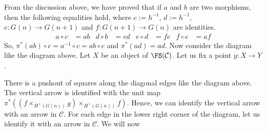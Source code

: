 \documentclass[a4paper,reqno,oneside]{article}
\begin{document}
From the discussion above, we have proved that if $a$ and $b$ are two morphisms, then the following equalities hold, where $c := h^{-1}$, $d := h^{-1}$, $e: G(n) \rightarrow G(n + 1)$ and $f: G(n + 1) \rightarrow G(n)$ are identities.
\[
\begin{array}{ccccl}
a \circ c &= ab & d \circ b &= cd & e \circ d &= fe & f \circ e &= af
\end{array}
\]
So, $\pi^{*}(ab) \circ c = a^{-1} \circ c = ab \circ c$ and $\pi^{*}(ad) = ad$. Now consider the diagram like the diagram above. Let $X$ be an object of $\FS(\mathcal{C})$. Let us fix a point $y: X \rightarrow Y$.

There is a pushout of squares along the diagonal edges like the diagram above. The vertical arrow is identified with the unit map $\pi^{*}((f \times_{H^{\times}(G(n))} g) \times_{H^{\times}(G(n))} f)$. Hence, we can identify the vertical arrow with an arrow in $\mathcal{C}$. For each edge in the lower right corner of the diagram, let us identify it with an arrow in $\mathcal{C}$. We will now
\end{document}
